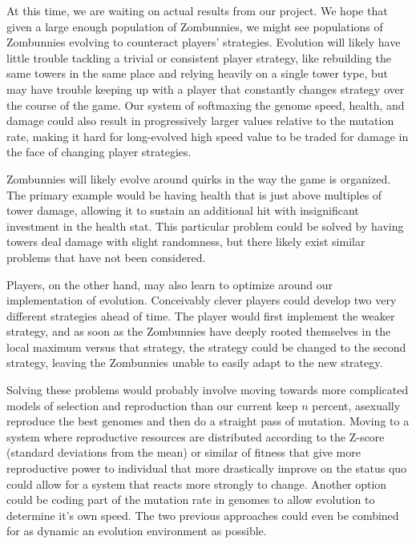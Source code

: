 \documentclass[letterpaper]{article}
\begin{document}
At this time, we are waiting on actual results from our project.
We hope that given a large enough population of Zombunnies, we might see
populations of Zombunnies evolving to counteract players' strategies. Evolution
will likely have little trouble tackling a trivial or consistent player
strategy, like rebuilding the same towers in the same place and
relying heavily on a single tower type, but may have trouble keeping
up with a player that constantly changes strategy over the course of the game.
Our system of softmaxing the genome speed, health, and damage could also
result in progressively larger values relative to the mutation rate, making it
hard for long-evolved high speed value to be traded for damage in the face of
changing player strategies.

Zombunnies will likely evolve around quirks in the way the
game is organized. The primary example would be having health that is just above
multiples of tower damage, allowing it to sustain an additional hit with
insignificant investment in the health stat. This particular problem could be
solved by having towers deal damage with slight randomness, but there likely
exist similar problems that have not been considered.

Players, on the other hand, may also learn to optimize around our implementation
of evolution. Conceivably clever players could develop two very different
strategies ahead of time. The player would first implement the weaker strategy,
and as soon as the Zombunnies have deeply rooted themselves in the local maximum
versus that strategy, the strategy could be changed to the second strategy,
leaving the Zombunnies unable to easily adapt to the new strategy.

Solving these problems would probably involve moving towards more complicated
models of selection and reproduction than our current keep \(n\) percent,
asexually reproduce the best genomes and then do a straight pass of mutation.
Moving to a system where reproductive resources are distributed according to the
Z-score (standard deviations from the mean) or similar of fitness that give more
reproductive power to individual that more drastically improve on the status quo
could allow for a system that reacts more strongly to change. Another option
could be coding part of the mutation rate in genomes to allow evolution to
determine it's own speed. The two previous approaches could even be combined for
as dynamic an evolution environment as possible.
\end{document}
